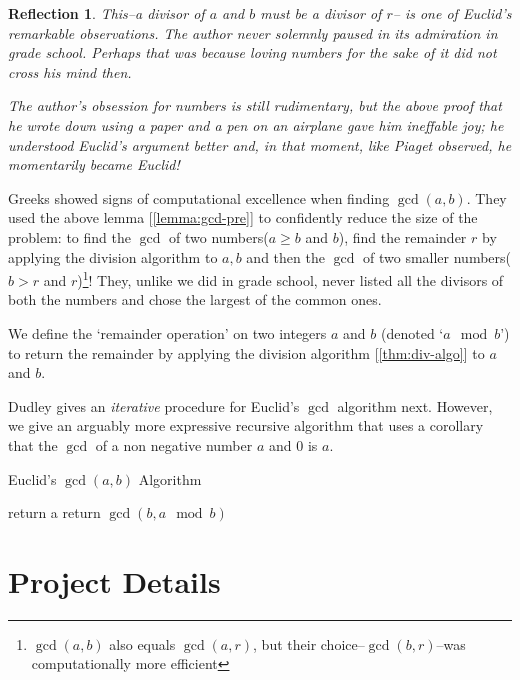 \documentclass[english,notitlepage,smartquotes]{hgbreport}
\theoremstyle{definition}
\theoremstyle{remark}
\theoremstyle{plain}
\newtheorem{reflection}{Reflection}
\begin{document}
\begin{reflection}
This--a divisor of $a$ and $b$ must be a divisor of $r$-- is one of Euclid's remarkable observations. The author never solemnly paused in its admiration in grade school. Perhaps that was because loving numbers for the sake of it did not cross his mind then.

The author's obsession for numbers is still rudimentary, but the above proof that he wrote down using a paper and a pen on an airplane gave him ineffable joy; he understood Euclid's argument better and, in that moment, like Piaget \cite{Piaget1974} observed, he \emph{momentarily became Euclid}! 
\end{reflection}

Greeks showed signs of computational excellence when finding $\gcd(a,b)$. They used the above lemma [\ref{lemma:gcd-pre}] to confidently reduce the size of the problem: to find the $\gcd$ of two numbers($a\geq b$ and $b$), find the remainder $r$ by applying the division algorithm to $a,b$ and then the $\gcd$ of two smaller numbers($b>r$ and $r$)\footnote{$\gcd(a,b)$ also equals $\gcd(a,r)$, but their choice--$\gcd(b,r)$--was computationally more efficient}! They, unlike we did in grade school, never listed all the divisors of both the numbers and chose the largest of the common ones.

We define the `remainder operation' on two integers $a$ and $b$ (denoted `$a\mod b$') to return the remainder by applying the division algorithm [\ref{thm:div-algo}] to $a$ and $b$.

Dudley gives an \emph{iterative} procedure for Euclid's $\gcd$ algorithm next. However, we give an arguably more expressive recursive algorithm that uses a corollary that the $\gcd$ of a non negative number $a$ and $0$ is $a$. 

\begin{algorithm}
\label{alg:euclid}
\begin{algorithmic}
\caption{Euclid's $\gcd(a,b)$ Algorithm}
    \State return a
  \Else
    \State return $\gcd(b,a\mod b)$
  \EndIf
\end{algorithmic}
\end{algorithm}
\chapter{Project Details}
\end{document}
